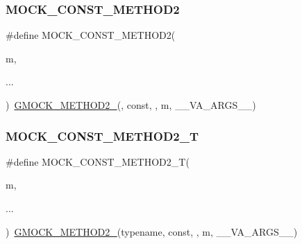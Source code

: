 \mbox{\label{_obj__test_2lib_2googletest-release-1_88_81_2googlemock_2include_2gmock_2gmock-generated-function-mockers_8h_a31c489715704817a3f40d178404c61e8}} 
\subsubsection{\texorpdfstring{MOCK\_CONST\_METHOD2}{MOCK\_CONST\_METHOD2}}
{\footnotesize\ttfamily \#define M\+O\+C\+K\+\_\+\+C\+O\+N\+S\+T\+\_\+\+M\+E\+T\+H\+O\+D2(\begin{DoxyParamCaption}\item[{}]{m,  }\item[{}]{... }\end{DoxyParamCaption})~\mbox{\hyperlink{_obj__test_2lib_2googletest-release-1_88_81_2googlemock_2include_2gmock_2gmock-generated-function-mockers_8h_a885295ca6bebb15efb3fc786218c5d47}{G\+M\+O\+C\+K\+\_\+\+M\+E\+T\+H\+O\+D2\+\_\+}}(, const, , m, \+\_\+\+\_\+\+V\+A\+\_\+\+A\+R\+G\+S\+\_\+\+\_\+)}

\mbox{\label{_obj__test_2lib_2googletest-release-1_88_81_2googlemock_2include_2gmock_2gmock-generated-function-mockers_8h_a4337d7257aa4edff048aa406073b718b}} 
\subsubsection{\texorpdfstring{MOCK\_CONST\_METHOD2\_T}{MOCK\_CONST\_METHOD2\_T}}
{\footnotesize\ttfamily \#define M\+O\+C\+K\+\_\+\+C\+O\+N\+S\+T\+\_\+\+M\+E\+T\+H\+O\+D2\+\_\+T(\begin{DoxyParamCaption}\item[{}]{m,  }\item[{}]{... }\end{DoxyParamCaption})~\mbox{\hyperlink{_obj__test_2lib_2googletest-release-1_88_81_2googlemock_2include_2gmock_2gmock-generated-function-mockers_8h_a885295ca6bebb15efb3fc786218c5d47}{G\+M\+O\+C\+K\+\_\+\+M\+E\+T\+H\+O\+D2\+\_\+}}(typename, const, , m, \+\_\+\+\_\+\+V\+A\+\_\+\+A\+R\+G\+S\+\_\+\+\_\+)}

